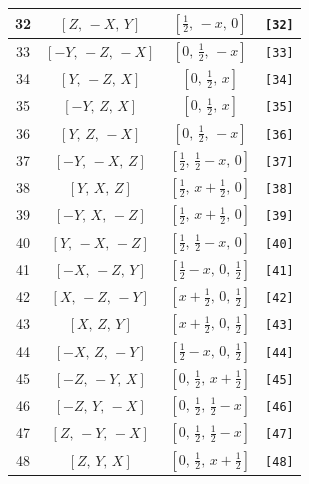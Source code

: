 \documentclass[fleqn,8pt]{jsarticle}
\begin{document}
\begin{longtable}{cccc}
32 & $\left[ Z,\, - X,\, Y \right]$ & $\left[ \frac{1}{2},\, - x,\, 0 \right]$ & {\tt [32]} \\ \hline
33 & $\left[ - Y,\, - Z,\, - X \right]$ & $\left[ 0,\, \frac{1}{2},\, - x \right]$ & {\tt [33]} \\ \hline
34 & $\left[ Y,\, - Z,\, X \right]$ & $\left[ 0,\, \frac{1}{2},\, x \right]$ & {\tt [34]} \\ \hline
35 & $\left[ - Y,\, Z,\, X \right]$ & $\left[ 0,\, \frac{1}{2},\, x \right]$ & {\tt [35]} \\ \hline
36 & $\left[ Y,\, Z,\, - X \right]$ & $\left[ 0,\, \frac{1}{2},\, - x \right]$ & {\tt [36]} \\ \hline
37 & $\left[ - Y,\, - X,\, Z \right]$ & $\left[ \frac{1}{2},\, \frac{1}{2} - x,\, 0 \right]$ & {\tt [37]} \\ \hline
38 & $\left[ Y,\, X,\, Z \right]$ & $\left[ \frac{1}{2},\, x + \frac{1}{2},\, 0 \right]$ & {\tt [38]} \\ \hline
39 & $\left[ - Y,\, X,\, - Z \right]$ & $\left[ \frac{1}{2},\, x + \frac{1}{2},\, 0 \right]$ & {\tt [39]} \\ \hline
40 & $\left[ Y,\, - X,\, - Z \right]$ & $\left[ \frac{1}{2},\, \frac{1}{2} - x,\, 0 \right]$ & {\tt [40]} \\ \hline
41 & $\left[ - X,\, - Z,\, Y \right]$ & $\left[ \frac{1}{2} - x,\, 0,\, \frac{1}{2} \right]$ & {\tt [41]} \\ \hline
42 & $\left[ X,\, - Z,\, - Y \right]$ & $\left[ x + \frac{1}{2},\, 0,\, \frac{1}{2} \right]$ & {\tt [42]} \\ \hline
43 & $\left[ X,\, Z,\, Y \right]$ & $\left[ x + \frac{1}{2},\, 0,\, \frac{1}{2} \right]$ & {\tt [43]} \\ \hline
44 & $\left[ - X,\, Z,\, - Y \right]$ & $\left[ \frac{1}{2} - x,\, 0,\, \frac{1}{2} \right]$ & {\tt [44]} \\ \hline
45 & $\left[ - Z,\, - Y,\, X \right]$ & $\left[ 0,\, \frac{1}{2},\, x + \frac{1}{2} \right]$ & {\tt [45]} \\ \hline
46 & $\left[ - Z,\, Y,\, - X \right]$ & $\left[ 0,\, \frac{1}{2},\, \frac{1}{2} - x \right]$ & {\tt [46]} \\ \hline
47 & $\left[ Z,\, - Y,\, - X \right]$ & $\left[ 0,\, \frac{1}{2},\, \frac{1}{2} - x \right]$ & {\tt [47]} \\ \hline
48 & $\left[ Z,\, Y,\, X \right]$ & $\left[ 0,\, \frac{1}{2},\, x + \frac{1}{2} \right]$ & {\tt [48]} \\
\end{longtable}
\end{document}
